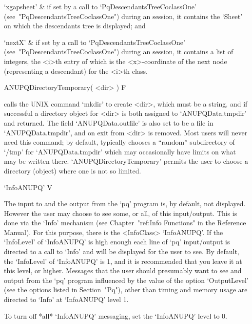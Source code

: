 \quad`xgapsheet' & if set  by  a  call  to  `PqDescendantsTreeCoclassOne'
(see~"PqDescendantsTreeCoclassOne")  during  an   {\XGAP}   session,   it
contains the {\XGAP} `Sheet' on which the descendants tree is  displayed;
and

\quad`nextX'  &  if  set  by  a  call  to   `PqDescendantsTreeCoclassOne'
(see~"PqDescendantsTreeCoclassOne")  during  an   {\XGAP}   session,   it
contains  a  list  of  integers,  the  <i>th  entry  of  which   is   the
<x>-coordinate of the next node (representing a descendant) for the <i>th
class.

\enditems

\>ANUPQDirectoryTemporary( <dir> ) F

calls the UNIX command `mkdir' to create <dir>, which must be  a  string,
and if successful a directory  object  for  <dir>  is  both  assigned  to
`ANUPQData.tmpdir' and returned. The field  `ANUPQData.outfile'  is  also
set to be a file in `ANUPQData.tmpdir', and on exit from {\GAP} <dir>  is
removed. Most users will never need  this  command;  by  default,  {\GAP}
typically   chooses   a   ``random''   subdirectory   of    `/tmp'    for
`ANUPQData.tmpdir' which may occasionally have  limits  on  what  may  be
written there. `ANUPQDirectoryTemporary' permits the  user  to  choose  a
directory (object) where one is not so limited.


\>`InfoANUPQ' V

The input to and the output from the `pq' program  is,  by  default,  not
displayed. However the user may choose to  see  some,  or  all,  of  this
input/output.   This   is   done   via   the   `Info'   mechanism    (see
Chapter~"ref:Info Functions" in the {\GAP} Reference  Manual).  For  this
purpose, there is the <InfoClass>  `InfoANUPQ'.  If  the  `InfoLevel'  of
`InfoANUPQ' is high enough each line of `pq' input/output is directed  to
a call to `Info' and will be displayed for the user to see.  By  default,
the `InfoLevel' of `InfoANUPQ' is 1, and it is recommended that you leave
it at this level, or higher. Messages that  the  user  should  presumably
want to see and output from the `pq' program influenced by the  value  of
the option `OutputLevel' (see the options listed in Section~"Pq"),  other
than timing and memory usage are directed to `Info' at `InfoANUPQ'  level
1.

To turn off *all* `InfoANUPQ' messaging, set the `InfoANUPQ' level to 0.

